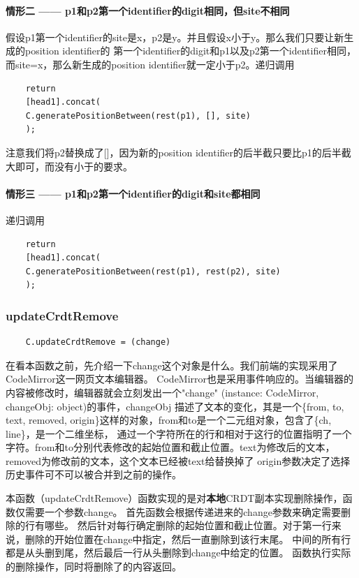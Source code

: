 \documentclass[11pt]{ctexart}
\begin{document}
\paragraph{情形二 —— p1和p2第一个identifier的digit相同，但site不相同}
假设p1第一个identifier的site是x，p2是y。并且假设x小于y。那么我们只要让新生成的position identifier的
第一个identifier的digit和p1以及p2第一个identifier相同，而site=x，那么新生成的position identifier就一定小于p2。递归调用
\begin{verbatim}
    return 
    [head1].concat(
    C.generatePositionBetween(rest(p1), [], site)
    );
\end{verbatim}

注意我们将p2替换成了[]，因为新的position identifier的后半截只要比p1的后半截大即可，而没有小于的要求。
\paragraph{情形三 —— p1和p2第一个identifier的digit和site都相同}
递归调用
\begin{verbatim}
    return 
    [head1].concat(
    C.generatePositionBetween(rest(p1), rest(p2), site)
    );
\end{verbatim}

\subsubsection{\textsf{updateCrdtRemove}}
\begin{verbatim}
    C.updateCrdtRemove = (change)
\end{verbatim}

在看本函数之前，先介绍一下\textsf{change}这个对象是什么。我们前端的实现采用了CodeMirror这一网页文本编辑器。
CodeMirror也是采用事件响应的。当编辑器的内容被修改时，编辑器就会立刻发出一个\textsf{"change" (instance: CodeMirror, changeObj: object)}的事件，\textsf{changeObj}
描述了文本的变化，其是一个\textsf{\{from, to, text, removed, origin\}}这样的对象，from和to是一个二元组对象，包含了\textsf{\{ch, line\}}，是一个二维坐标，
通过一个字符所在的行和相对于这行的位置指明了一个字符。from和to分别代表修改的起始位置和截止位置。text为修改后的文本，removed为修改前的文本，这个文本已经被text给替换掉了
origin参数决定了选择历史事件可不可以被合并到之前的操作。

本函数（\textsf{updateCrdtRemove}）函数实现的是对\textbf{本地}CRDT副本实现删除操作，函数仅需要一个参数change。
首先函数会根据传递进来的change参数来确定需要删除的行有哪些。
然后针对每行确定删除的起始位置和截止位置。对于第一行来说，删除的开始位置在change中指定，然后一直删除到该行末尾。
中间的所有行都是从头删到尾，然后最后一行从头删除到change中给定的位置。
函数执行实际的删除操作，同时将删除了的内容返回。
\end{document}

